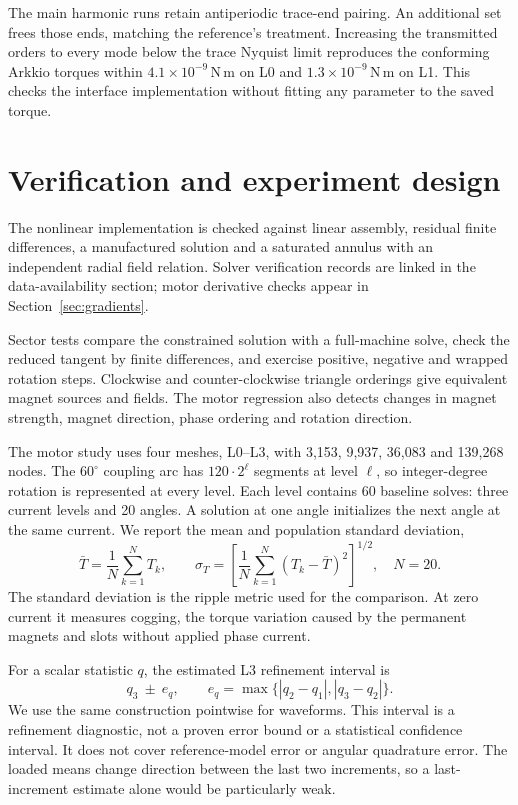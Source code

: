 \documentclass{anvil-paper}
\begin{document}
The main harmonic runs retain antiperiodic trace-end pairing. An additional
set frees those ends, matching the reference's treatment. Increasing the
transmitted orders to every mode below the trace Nyquist limit reproduces
the conforming Arkkio torques within $4.1\times10^{-9}$\,N\,m on L0 and
$1.3\times10^{-9}$\,N\,m on L1. This checks the interface implementation
without fitting any parameter to the saved torque.

\section{Verification and experiment design}
The nonlinear implementation is checked against linear assembly, residual
finite differences, a manufactured solution and a saturated annulus with
an independent radial field relation. Solver verification records are
linked in the data-availability section; motor derivative checks appear
in Section~\ref{sec:gradients}.

Sector tests compare the constrained solution with a full-machine solve,
check the reduced tangent by finite differences, and exercise positive,
negative and wrapped rotation steps. Clockwise and counter-clockwise
triangle orderings give equivalent magnet sources and fields. The motor
regression also detects changes in magnet strength, magnet direction,
phase ordering and rotation direction.

The motor study uses four meshes, L0--L3, with 3,153, 9,937, 36,083 and
139,268 nodes. The $60^\circ$ coupling arc has $120\cdot2^\ell$ segments at level
$\ell$, so integer-degree rotation is represented at every level.
Each level contains 60 baseline solves: three current levels and 20
angles. A solution at one angle initializes the next angle at the same
current. We report the mean and population standard deviation,
\begin{equation}
 \bar T=\frac1N\sum_{k=1}^N T_k,\qquad
 \sigma_T=\left[\frac1N\sum_{k=1}^N(T_k-\bar T)^2\right]^{1/2},
 \quad N=20.
\end{equation}
The standard deviation is the ripple metric used for the comparison.
At zero current it measures cogging, the torque variation caused by the
permanent magnets and slots without applied phase current.

For a scalar statistic $q$, the estimated L3 refinement interval is
\begin{equation}
 q_3\ \pm\ e_q,\qquad
 e_q=\max\{|q_2-q_1|,|q_3-q_2|\}.
 \label{eq:band}
\end{equation}
We use the same construction pointwise for waveforms. This interval is a
refinement diagnostic, not a proven error bound or a statistical confidence
interval. It does not cover reference-model error or angular quadrature
error. The loaded means change direction between the last two increments,
so a last-increment estimate alone would be particularly weak.
\end{document}
